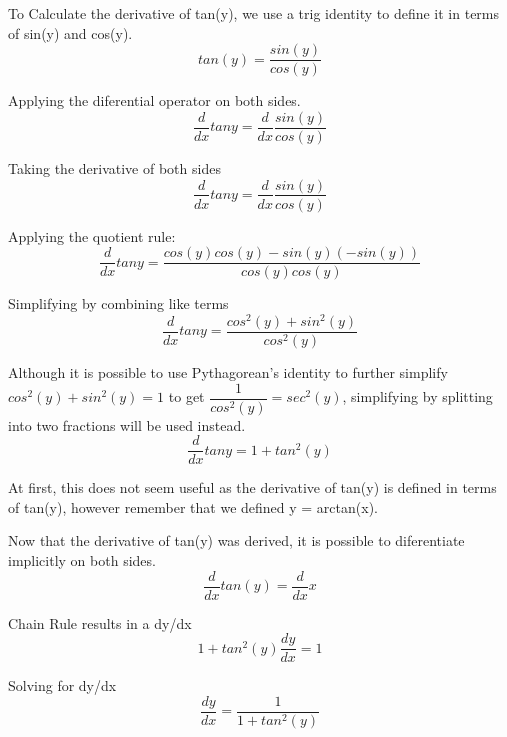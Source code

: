 \documentclass[12pt, titlepage]{article}
\begin{document}
To Calculate the derivative of tan(y), we use a trig identity to define it in terms of sin(y) and cos(y).
\begin{equation}
 tan(y) = \frac{sin(y)}{cos(y)}
\end{equation}

Applying the diferential operator on both sides.
\begin{equation}
  \frac{d}{dx} tany = \frac{d}{dx} \frac{sin(y)}{cos(y)}
\end{equation}

Taking the derivative of both sides
\begin{equation}
  \frac{d}{dx} tany = \frac{d}{dx} \frac{sin(y)}{cos(y)}
\end{equation}

Applying the quotient rule:
\begin{equation}
  \frac{d}{dx} tany = \frac{cos(y)cos(y) - sin(y)(-sin(y))}{cos(y)cos(y)}
\end{equation}

Simplifying by combining like terms
\begin{equation}
  \frac{d}{dx} tany = \frac{cos^{2}(y) + sin^{2}(y)}{cos^{2}(y)}
\end{equation}

Although it is possible to use Pythagorean's identity to further simplify \(cos^{2}(y) + sin^{2}(y) = 1\) to get \(\dfrac{1}{cos^{2}(y)} = sec^{2}(y)\), simplifying by splitting into two fractions will be used instead. 
\begin{equation}
  \frac{d}{dx} tany = 1 + tan^{2}(y)
\end{equation}

At first, this does not seem useful as the derivative of tan(y) is defined in terms of tan(y), however remember that we defined y = arctan(x).

Now that the derivative of tan(y) was derived, it is possible to diferentiate implicitly on both sides.
\begin{equation}
 \frac{d}{dx} tan(y) = \frac{d}{dx} x
\end{equation}

Chain Rule results in a dy/dx
\begin{equation}
 1 + tan^{2}(y) \frac{dy}{dx}  = 1
\end{equation}

Solving for dy/dx
\begin{equation}
 \frac{dy}{dx}  = \frac{1}{1 + tan^{2}(y)}
\end{equation}
\end{document}
